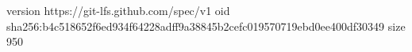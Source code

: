 version https://git-lfs.github.com/spec/v1
oid sha256:b4c518652f6ed934f64228adff9a38845b2cefc019570719ebd0ee400df30349
size 950

